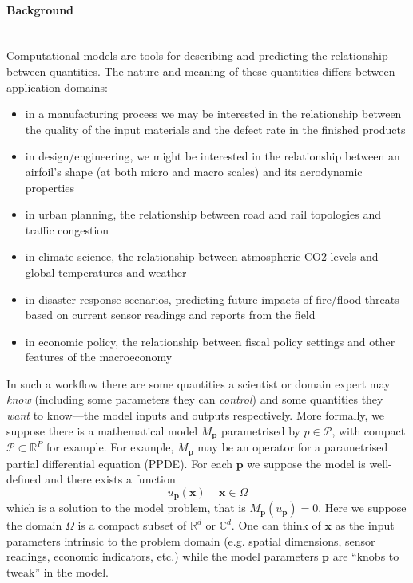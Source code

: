 \documentclass[a4paper,fontsize=12pt]{scrartcl}
\begin{document}
\paragraph*{Background}\mbox{}\\

Computational models are tools for describing and predicting the
relationship between quantities. The nature and meaning of these
quantities differs between application domains:
\begin{itemize}
\item in a manufacturing process we may be interested in the
  relationship between the quality of the input materials and the
  defect rate in the finished products
\item in design/engineering, we might be interested in the
  relationship between an airfoil's shape (at both micro and macro
  scales) and its aerodynamic properties
\item in urban planning, the relationship between road and rail
  topologies and traffic congestion
\item in climate science, the relationship between atmospheric CO2
  levels and global temperatures and weather
\item in disaster response scenarios, predicting future impacts of
  fire/flood threats based on current sensor readings and reports from
  the field
\item in economic policy, the relationship between fiscal policy
  settings and other features of the macroeconomy
\end{itemize}
In such a workflow there are some quantities a scientist or domain
expert may \emph{know} (including some parameters they can
\emph{control}) and some quantities they \emph{want} to know---the
model inputs and outputs respectively. More formally, we suppose there is a mathematical model $M_{\mathbf{p}}$ parametrised by $p\in\mathcal{P}$, with compact $\mathcal{P}\subset\mathbb{R}^{P}$ for example.
For example, $M_{\mathbf{p}}$ may be an operator for a parametrised partial differential equation (PPDE).
For each $\mathbf{p}$ we suppose the model is well-defined and there exists a function 
\begin{equation}
  \label{eq:1}
  u_{\mathbf{p}}(\mathbf{x})\, \quad \mathbf{x}\in\Omega
\end{equation}
which is a solution to the model problem, that is $M_{\mathbf{p}}(u_{\mathbf{p}})=0$.
Here we suppose the domain $\Omega$ is a compact subset of $\mathbb{R}^{d}$ or $\mathbb{C}^{d}$. 
One can think of $\mathbf{x}$ as the input parameters intrinsic to the
problem domain (e.g. spatial dimensions, sensor readings, economic
indicators, etc.) while the model parameters $\mathbf{p}$ are ``knobs
to tweak'' in the model.
\end{document}
